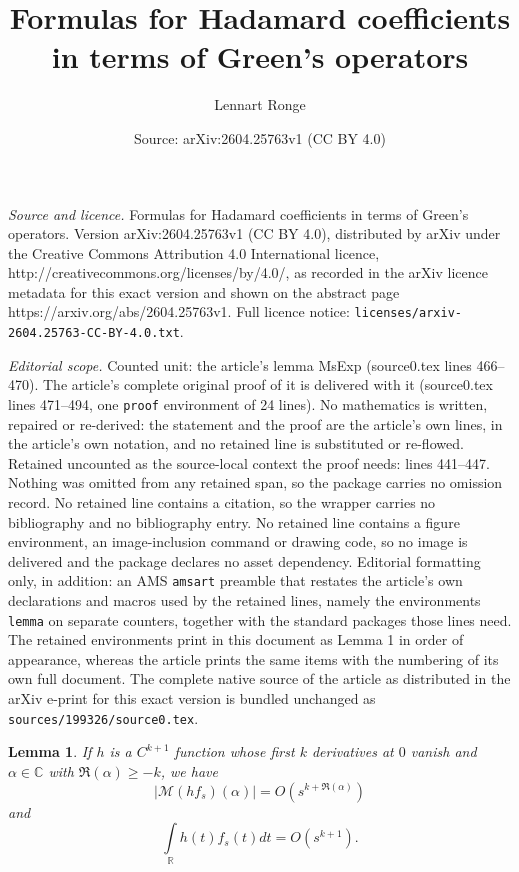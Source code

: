 \documentclass[10pt,a4paper]{amsart}
\title{Formulas for Hadamard coefficients in terms of Green's operators}
\author{Lennart Ronge}
\date{Source: arXiv:2604.25763v1 (CC BY 4.0)}
\newtheorem{lemma}{Lemma}
\def\C{{\mathbb{C}}}
\def\M{\mathcal{M}}
\def\R{{\mathbb{R}}}
\def\intR{\int\limits_\R}
\begin{document}
\maketitle

\noindent\emph{Source and licence.} Formulas for Hadamard coefficients in terms of Green's operators. Version arXiv:2604.25763v1 (CC BY 4.0), distributed by arXiv under the Creative Commons Attribution 4.0 International licence, http://creativecommons.org/licenses/by/4.0/, as recorded in the arXiv licence metadata for this exact version and shown on the abstract page https://arxiv.org/abs/2604.25763v1. Full licence notice: \texttt{licenses/arxiv-2604.25763-CC-BY-4.0.txt}.\par\smallskip

\noindent\textit{Editorial scope.} Counted unit: the article's lemma MsExp (source0.tex lines 466--470). The article's complete original proof of it is delivered with it (source0.tex lines 471--494, one \texttt{proof} environment of 24 lines). No mathematics is written, repaired or re-derived: the statement and the proof are the article's own lines, in the article's own notation, and no retained line is substituted or re-flowed.  Retained uncounted as the source-local context the proof needs: lines 441--447.  Nothing was omitted from any retained span, so the package carries no omission record.  No retained line contains a citation, so the wrapper carries no bibliography and no bibliography entry.  No retained line contains a figure environment, an image-inclusion command or drawing code, so no image is delivered and the package declares no asset dependency.  Editorial formatting only, in addition: an AMS \texttt{amsart} preamble that restates the article's own declarations and macros used by the retained lines, namely the environments \texttt{lemma} on separate counters, together with the standard packages those lines need.  The retained environments print in this document as Lemma 1 in order of appearance, whereas the article prints the same items with the numbering of its own full document.  The complete native source of the article as distributed in the arXiv e-print for this exact version is bundled unchanged as \texttt{sources/199326/source0.tex}.
\begin{lemma}
	\label{IntRem}
	If $h$ is a $C^{k+1}$ function whose first $k$ derivatives at $0$ vanish and $\alpha\in \C$ with $\Re(\alpha)\geq -k$, we have
	\[|\M(hf_s)(\alpha)|=O(s^{k+\Re(\alpha)})\]
	and
	\[\intR h(t)f_s(t)dt=O(s^{k+1}).\]
\end{lemma}
\end{document}
